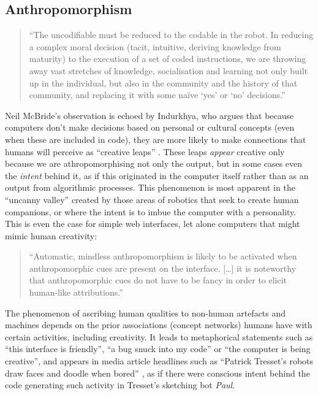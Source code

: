 \subsection{Anthropomorphism}

\begin{quotation}
  ``The uncodifiable must be reduced to the codable in the robot. In reducing a complex moral decision (tacit, intuitive, deriving knowledge from maturity) to the execution of a set of coded instructions, we are throwing away vast stretches of knowledge, socialisation and learning not only built up in the individual, but also in the community and the history of that community, and replacing it with some na{\"i}ve `yes' or `no' decisions.'' 
\end{quotation}

Neil McBride's observation is echoed by Indurkhya, who argues that because computers don't make decisions based on personal or cultural concepts (even when these are included in code), they are more likely to make connections that humans will perceive as ``creative leaps'' \autocite{Indurkhya}. These leaps \textit{appear} creative only because we are athropomorphising not only the output, but in some cases even the \textit{intent} behind it, as if this originated in the computer itself rather than as an output from algorithmic processes. This phenomenon is most apparent in the ``uncanny valley'' created by those areas of robotics that seek to create human companions, or where the intent is to imbue the computer with a personality. This is even the case for simple web interfaces, let alone computers that might mimic human creativity:

\begin{quotation}
  ``Automatic, mindless anthropomorphism is likely to be activated when anthropomorphic cues are present on the interface. [\ldots] it is noteworthy that anthropomorphic cues do not have to be fancy in order to elicit human-like attributions.'' 
\end{quotation}

The phenomenon of ascribing human qualities to non-human artefacts and machines depends on the prior associations (concept networks) humans have with certain activities, including creativity. It leads to metaphorical statements such as ``this interface is friendly'', ``a bug snuck into my code'' or ``the computer is being creative'', and appears in media article headlines such as ``Patrick Tresset's robots draw faces and doodle when bored'' \autocite{Wired2011}, as if there were conscious intent behind the code generating such activity in Tresset's sketching bot \textit{Paul}.


